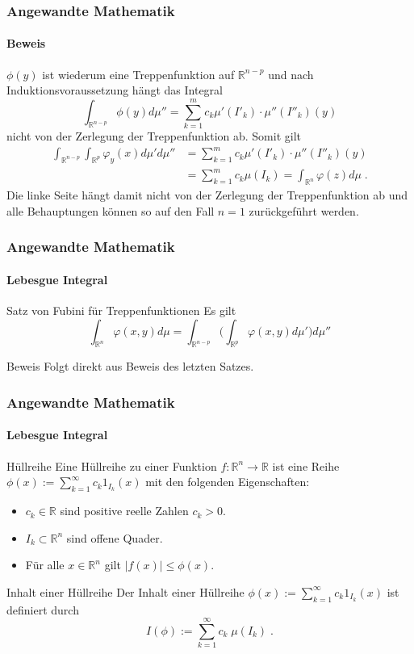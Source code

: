 \documentclass{beamer}
\begin{document}
\begin{frame}
    \frametitle{Angewandte Mathematik}
\framesubtitle{Beweis}

$\phi(y)$ ist wiederum eine Treppenfunktion auf $\mathbb{R}^{n-p}$ und nach Induktionsvoraussetzung hängt das Integral 
$$\int_{\mathbb{R}^{n-p}}  \phi(y) d \mu'' = \sum_{k=1}^m  c_k \mu'(I'_k)  \cdot \mu'' (I''_k)(y) $$
nicht von der Zerlegung der Treppenfunktion ab. Somit gilt
\begin{align*}
\int_{\mathbb{R}^{n-p}} \int_{\mathbb{R}^p}  \varphi_y(x) d \mu'  d \mu''  & =   \sum_{k=1}^m  c_k \mu'(I'_k)  \cdot \mu''(I''_k)(y) \\
& = \sum_{k=1}^m  c_k  \mu(I_k)  = \int_{\mathbb{R}^n} \varphi(z) d\mu\;.
\end{align*}
Die linke Seite hängt  damit nicht von der Zerlegung der Treppenfunktion ab und alle Behauptungen können so auf den Fall $n=1$ zurückgeführt werden.
 \end{frame}


\begin{frame}
    \frametitle{Angewandte Mathematik}
\framesubtitle{Lebesgue Integral}
    \begin{block}{Satz von Fubini für Treppenfunktionen}
Es gilt $$\int_{\mathbb{R}^n} \varphi(x,y) d \mu = \int_{\mathbb{R}^{n-p}} \biggl (\int_{\mathbb{R}^{p}}  \varphi(x,y) d \mu' \biggr ) d \mu''$$
\end{block}
    \begin{block}{Beweis}
Folgt direkt aus Beweis des letzten Satzes.
\end{block}
 \end{frame}


\begin{frame}
    \frametitle{Angewandte Mathematik}
\framesubtitle{Lebesgue Integral}
    \begin{block}{Hüllreihe}
Eine Hüllreihe zu einer Funktion $f :\mathbb{R}^n \to \mathbb{R}$ ist eine Reihe $\phi(x):= \sum_{k=1}^{\infty} c_k  1_{I_k} (x)$ mit den folgenden Eigenschaften:
\begin{itemize}
\item $c_k \in \mathbb{R}$ sind positive reelle Zahlen $c_k >0$.
\item $I_k \subset \mathbb{R}^n$ sind offene Quader.
\item Für alle $x \in \mathbb{R}^n$ gilt $|f(x) | \leq \phi(x)$.
\end{itemize}
\end{block}

 \begin{block}{Inhalt einer Hüllreihe}
Der Inhalt einer Hüllreihe $\phi(x):= \sum_{k=1}^{\infty} c_k  1_{I_k} (x)$ ist definiert durch 
$$I (\phi) := \sum_{k=1}^{\infty} c_k \;  \mu(I_k) \; .$$
\end{block}

 \end{frame}
\end{document}
